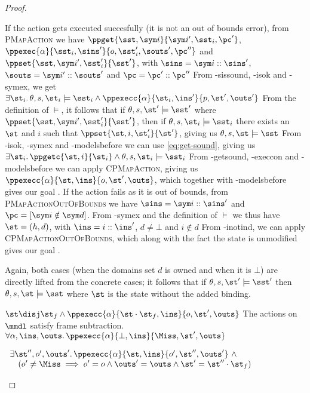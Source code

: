 \begin{proof}
\begin{hypvlist}
 If the action gets executed succesfully (it is not an out of bounds error), from \textsc{PMapAction} we have $\ppget{\sst,\sym i}{\sym i',\sst_i,\pc'}$, $\ppexec{\alpha}{\sst_i,\sins'}{o,\sst'_i,\souts',\pc''}$ and ${\ppset{\sst,\sym i',\sst'_i}{\sst'}}$, with $\sins=\sym i::\sins'$, $\souts=\sym i'::\souts'$ and $\pc=\pc'::\pc''$
 From \hyp{sissound}, \hyp{isok} and \hyp{symex}, we get $\exists \st_i\ldotp \theta,s,\st_i\models\sst_i \land \ppexecc{\alpha}{\st_i,\ins'}{p,\st',\outs'}$
 From the definition of $\models$, it follows that if $\theta,s,\st'\models\sst'$ where $\ppset{\sst,\sym i',\sst'_i}{\sst'}$, then if $\theta,s,\st_i\models\sst_i$ there exists an $\st$ and $i$ such that $\ppset{\st,i,\st_i'}{\st'}$, giving us $\theta,s,\st\models\sst$
 From \hyp{isok}, \hyp{symex} and \hyp{modelsbefore} we can use \ref{eq:get-sound}, giving us ${\exists \st_i \ldotp \ppgetc{\st, i}{\st_i}} \land \theta,s,\st_i \models \sst_i$
 From \hyp{getsound}, \hyp{execcon} and \hyp{modelsbefore} we can apply \textsc{CPMapAction}, giving us ${\ppexecc{\alpha}{\st,\ins}{o,\st',\outs}}$, which together with \hyp{modelsbefore} gives our goal .
 If the action fails as it is out of bounds, from \textsc{PMapActionOutOfBounds} we have $\sins=\sym i::\sins'$ and $\pc=[\sym i\notin \sym d]$.
 From \hyp{symex} and the definition of $\models$ we thus have $\st=(h,d)$, with $\ins=i::\ins'$, $d\neq\bot$ and $i\notin d$
 From \hyp{inotind}, we can apply \textsc{CPMapActionOutOfBounds}, which along with the fact the state is unmodified gives our goal .
\end{hypvlist}

\pfcase{$\alpha=\alloc$}

Again, both cases (when the domains set $d$ is owned and when it is $\bot$) are directly lifted from the concrete cases; it follows that if $\theta,s,\st'\models\sst'$ then $\theta,s,\st\models\sst$ where $\st$ is the state without the added binding.


\pfassume \begin{hypvlist}
 $\st\disj\st_f \land \ppexecc{\alpha}{\st\cdot\st_f,\ins}{o,\st',\outs}$
 The actions on $\mmdl$ satisfy frame subtraction.
{\color{red} $\forall \alpha, \ins, \outs\ldotp \ppexecc{\alpha}{\bot,\ins}{\Miss,\st',\outs}$}
\end{hypvlist}
\pfprove \begin{goalvlist}
 $\begin{array}{l}
\exists \st'', o', \outs'\ldotp \ppexecc{\alpha}{\st,\ins}{o', \st'', \outs'} ~\land \\
\quad(o' \neq \Miss \implies o' = o \land  \outs' = \outs \land \st' = \st'' \cdot \st_f)
\end{array}$
\end{goalvlist}


\end{proof}
